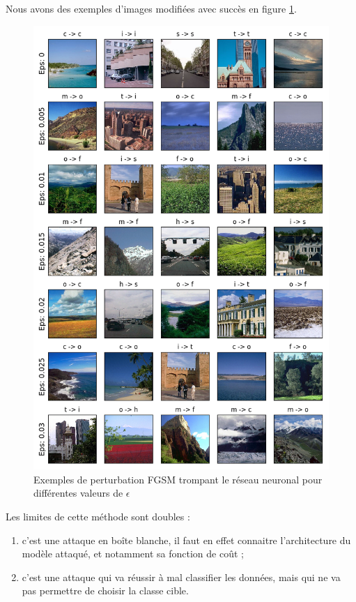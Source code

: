 \documentclass[10pt,twocolumn,letterpaper]{article}
\begin{document}
Nous avons des exemples d'images modifiées avec succès en figure \ref{fig:fgsm_img}.

\begin{figure}[!h]
\begin{center}
\includegraphics[width=0.9\linewidth]{ressources/fgsm_img.png}
\end{center}
   \caption{Exemples de perturbation FGSM trompant le réseau neuronal pour différentes valeurs de $\epsilon$}
\label{fig:fgsm_img}
\end{figure}

Les limites de cette méthode sont doubles : 
\begin{enumerate}
\item c'est une attaque en boîte blanche, il faut en effet connaitre l'architecture du modèle attaqué, et notamment sa fonction de coût ;
\item c'est une attaque qui va réussir à mal classifier les données, mais qui ne va pas permettre de choisir la classe cible.
\end{enumerate}
\end{document}
